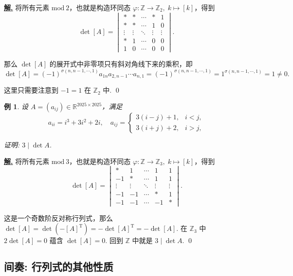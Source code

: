 \documentclass[10pt,openany]{article}
\theoremstyle{thmstyle} %
\theoremstyle{defstyle} %
\theoremstyle{prostyle} %
\theoremstyle{exastyle}
\newtheorem{example}[theorem]{例}
\theoremstyle{remstyle}
\newenvironment{solution}{\par\underline{\textbf{解.}} \;\fangsong}{\qed\par}
\newcommand{\T}{^{\text{T}}}
\begin{document}
\begin{solution}
	将所有元素 \( \text{mod} \ 2 \)，也就是构造环同态 \( \varphi: \mathbb{Z} \to \mathbb{Z}_2, \; k \mapsto [k] \)，得到
	\[ \det [A]=\begin{vmatrix}
		* & * & \cdots & * & 1 \\
		* & * & \cdots & 1 & 0 \\
		\vdots & \vdots & \ddots & \vdots & \vdots \\
		* & 1 & \cdots & 0 & 0 \\
		1 & 0 & \cdots & 0 & 0
	\end{vmatrix}.  \]
	
	那么 \( \det [A] \) 的展开式中非零项只有斜对角线下来的乘积，即
	\[ \det [A]= (-1)^{\sigma(n,n-1,\cdots,1)} a_{1n}a_{2,n-1}\cdots a_{n,1}=(-1)^{\sigma(n,n-1,\cdots,1)}=1^{\sigma(n,n-1,\cdots,1)}=1 \neq 0. \]
	
	这里只需要注意到 \( -1=1 \) 在 \( \mathbb{Z}_2 \) 中.
\end{solution}

\begin{example}
	设 \( A = (a_{ij}) \in \mathbb{R}^{2025 \times 2025} \)，满足
	\[
	a_{ii} = i^3 + 3i^2 + 2i, \quad
	a_{ij} = \left\{ \begin{array}{lr}
	3(i - j) + 1, & i < j, \\
	3(i + j) + 2, & i > j,
	\end{array}\right.
	\]
	
	证明: \( 3 \mid \det A \).
\end{example}

\begin{solution}
	将所有元素 \( \text{mod} \ 3 \)，也就是构造环同态 \( \varphi: \mathbb{Z} \to \mathbb{Z}_3, \; k \mapsto [k] \)，得到
	\[ \det [A]=\begin{vmatrix}
		* & 1 & \cdots & 1 & 1 \\
		-1 & * & \cdots & 1 & 1 \\
		\vdots & \vdots & \ddots & \vdots & \vdots \\
		-1 & -1 & \cdots & * & 1 \\
		-1 & -1 & \cdots & -1 & *
	\end{vmatrix}.  \]
	
	这是一个奇数阶反对称行列式，那么 \( \det [A]=\det (-[A]\T)= -\det [A]\T= -\det [A] \). 在 \( \mathbb{Z}_3 \) 中 \( 2\det [A]=0 \) 蕴含 \( \det [A]=0 \). 回到 \( \mathbb{Z} \) 中就是 \( 3 \mid \det A \).
\end{solution}


\subsection{间奏: 行列式的其他性质}
\end{document}
